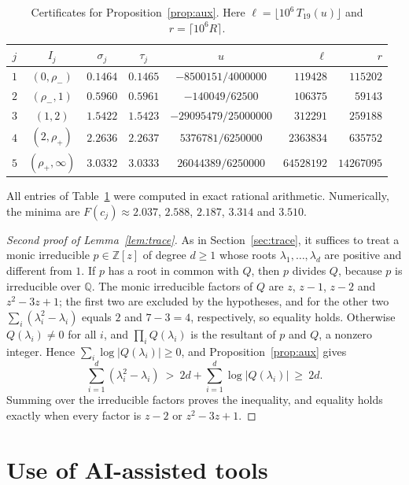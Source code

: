 \documentclass{amsart}
\theoremstyle{definition}
\theoremstyle{remark}
\numberwithin{equation}{section}
\newcommand{\Z}{\mathbb{Z}}
\newcommand{\Q}{\mathbb{Q}}
\newcommand{\rhom}{\rho_-}
\newcommand{\rhop}{\rho_+}
\begin{document}
\begin{table}[ht]
\centering
\caption{Certificates for Proposition~\ref{prop:aux}. Here $\ell=\lfloor 10^6\,T_{19}(u)\rfloor$ and $r=\lceil 10^6R\rceil$.}
\label{tab:cert}
\begin{tabular}{@{}cccccrr@{}}
\toprule
$j$ & $I_j$ & $\sigma_j$ & $\tau_j$ & $u$ & $\ell$ & $r$\\
\midrule
$1$ & $(0,\rhom)$ & $0.1464$ & $0.1465$ & $-8500151/4000000$ & $119428$ & $115202$\\
$2$ & $(\rhom,1)$ & $0.5960$ & $0.5961$ & $-140049/62500$ & $106375$ & $59143$\\
$3$ & $(1,2)$ & $1.5422$ & $1.5423$ & $-29095479/25000000$ & $312291$ & $259188$\\
$4$ & $(2,\rhop)$ & $2.2636$ & $2.2637$ & $5376781/6250000$ & $2363834$ & $635752$\\
$5$ & $(\rhop,\infty)$ & $3.0332$ & $3.0333$ & $26044389/6250000$ & $64528192$ & $14267095$\\
\bottomrule
\end{tabular}
\end{table}

All entries of Table~\ref{tab:cert} were computed in exact rational arithmetic. Numerically, the minima are $F(c_j)\approx 2.037$, $2.588$, $2.187$, $3.314$ and $3.510$.

\begin{proof}[Second proof of Lemma~\ref{lem:trace}]
As in Section~\ref{sec:trace}, it suffices to treat a monic irreducible $p\in\Z[z]$ of degree $d\ge1$ whose roots $\lambda_1,\dots,\lambda_d$ are positive and different from $1$. If $p$ has a root in common with $Q$, then $p$ divides $Q$, because $p$ is irreducible over $\Q$. The monic irreducible factors of $Q$ are $z$, $z-1$, $z-2$ and $z^2-3z+1$; the first two are excluded by the hypotheses, and for the other two $\sum_i(\lambda_i^2-\lambda_i)$ equals $2$ and $7-3=4$, respectively, so equality holds. Otherwise $Q(\lambda_i)\neq0$ for all $i$, and $\prod_iQ(\lambda_i)$ is the resultant of $p$ and $Q$, a nonzero integer. Hence $\sum_i\log|Q(\lambda_i)|\ge0$, and Proposition~\ref{prop:aux} gives
\[
\sum_{i=1}^d(\lambda_i^2-\lambda_i)\ >\ 2d+\sum_{i=1}^d\log|Q(\lambda_i)|\ \ge\ 2d.
\]
Summing over the irreducible factors proves the inequality, and equality holds exactly when every factor is $z-2$ or $z^2-3z+1$.
\end{proof}

\section*{Use of AI-assisted tools}
\end{document}
